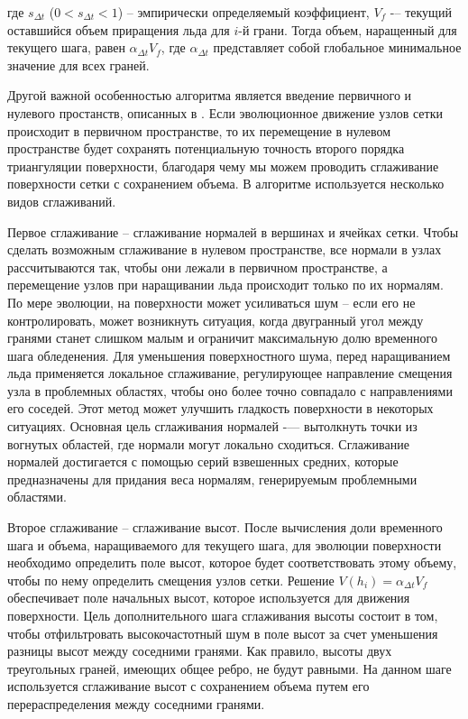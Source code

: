 где $s_{\Delta t}$ ($0 < s_{\Delta t} < 1$) -- эмпирически определяемый коэффициент, $V_f$ -– текущий оставшийся объем приращения льда для $i$-й грани.
Тогда объем, наращенный для текущего шага, равен $\alpha_{\Delta t} V_f$, где $\alpha_{\Delta t}$ представляет собой глобальное минимальное значение для всех граней.

Другой важной особенностью алгоритма является введение первичного и нулевого простанств, описанных в \cite{Jiao_null_space_smooth}.
Если эволюционное движение узлов сетки происходит в первичном пространстве, то их перемещение в нулевом пространстве будет сохранять потенциальную точность второго порядка триангуляции поверхности, благодаря чему мы можем  проводить сглаживание поверхности сетки с сохранением объема.
В алгоритме используется несколько видов сглаживаний.

Первое сглаживание -- сглаживание нормалей в вершинах и ячейках сетки.
Чтобы сделать возможным сглаживание в нулевом пространстве, все нормали в узлах рассчитываются так, чтобы они лежали в первичном пространстве, а перемещение узлов при наращивании льда происходит только по их нормалям.
По мере эволюции, на поверхности может усиливаться шум -- если его не контролировать, может возникнуть ситуация, когда двугранный угол между гранями станет слишком малым и ограничит максимальную долю временного шага обледенения.
Для уменьшения поверхностного шума, перед наращиванием льда применяется локальное сглаживание, регулирующее направление смещения узла в проблемных областях, чтобы оно более точно совпадало с направлениями его соседей.
Этот метод может улучшить гладкость поверхности в некоторых ситуациях.
Основная цель сглаживания нормалей -— вытолкнуть точки из вогнутых областей, где нормали могут локально сходиться.
Сглаживание нормалей достигается с помощью серий взвешенных средних, которые предназначены для придания веса нормалям, генерируемым проблемными областями.

Второе сглаживание -- сглаживание высот.
После вычисления доли временного шага и объема, наращиваемого для текущего шага, для эволюции поверхности необходимо определить поле высот, которое будет соответствовать этому объему, чтобы по нему определить смещения узлов сетки.
Решение $V(h_i) = \alpha_{\Delta t} V_f$ обеспечивает поле начальных высот, которое используется для движения поверхности.
Цель дополнительного шага сглаживания высоты состоит в том, чтобы отфильтровать высокочастотный шум в поле высот за счет уменьшения разницы высот между соседними гранями.
Как правило, высоты двух треугольных граней, имеющих общее ребро, не будут равными.
На данном шаге используется сглаживание высот с сохранением объема путем его перераспределения между соседними гранями.

